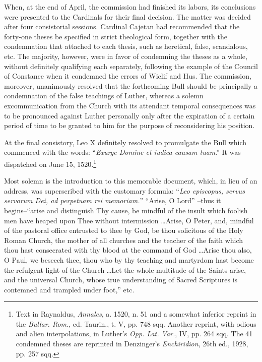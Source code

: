 When, at the end of April, the commission had finished its labors,
its conclusions were presented to the Cardinals for their final decision.
The matter was decided after four consistorial sessions. Cardinal Cajetan
had recommended that the forty-one theses be specified
in strict theological form, together with the condemnation that attached
to each thesis, such as heretical, false, scandalous, etc. The majority,
however, were in favor of condemning the theses as a whole,
without definitely qualifying each separately, following the example
of the Council of Constance when it condemned the errors of Wiclif
and Hus. The commission, moreover, unanimously resolved that the
forthcoming Bull should be principally a condemnation of the false
teachings of Luther, whereas a solemn excommunication from the
Church with its attendant temporal consequences was to be pronounced against
Luther personally only after the expiration of a
certain period of time to be granted to him for the purpose of reconsidering
his position.

At the final consistory, Leo X definitely resolved to promulgate the
Bull which commenced with the words: “\textit{Exurge Domine et iudica
causam tuam}.” It was dispatched on June 15, 1520.\footnote
{Text in Raynaldus, \textit{Annales}, a. 1520, n. 51 and a somewhat inferior reprint in the
\textit{Bullar. Rom.}, ed. Taurin., t. V, pp. 748 sqq. Another reprint, with odious and alien interpolations,
in Luther’s \textit{Opp. Lat. Var.}, IV, pp. 264 sqq. The 41 condemned theses are
reprinted in Denzinger’s \textit{Enchiridion}, 26th ed., 1928, pp. 257 sqq.}

Most solemn is the introduction to this memorable document, which, in
lieu of an address, was superscribed with the customary formula: ``\textit{Leo episcopus,
servus servorum Dei, ad perpetuam rei memoriam.}” “Arise, O Lord”
--thus it begins--``arise and distinguish Thy cause, be mindful of the insult
which foolish men have heaped upon Thee without intermission \dots Arise,
O Peter, and, mindful of the pastoral office entrusted to thee by God,
be thou solicitous of the Holy Roman Church, the mother of all churches
and the teacher of the faith which thou hast consecrated with thy blood
at the command of God \dots Arise thou also, O Paul, we beseech thee,
thou who by thy teaching and martyrdom hast become the refulgent light
of the Church \dots Let the whole multitude of the Saints arise, and the
universal Church, whose true understanding of Sacred Scriptures is
contemned and trampled under foot,” etc.

